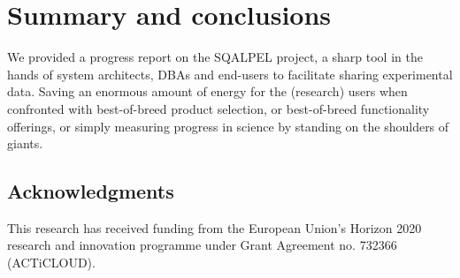 \documentclass{cidr-2019}
\begin{document}
\section{Summary and conclusions}\label{Summary and conclusions}

We provided a progress report on the {\sc SQALPEL} project, a sharp
tool in the hands of system architects, DBAs and end-users to
facilitate sharing experimental data.
Saving an enormous amount of energy for the (research) users when
confronted with best-of-breed product selection, or best-of-breed
functionality offerings, or simply measuring progress in science by
standing on the shoulders of giants.







\subsection*{Acknowledgments} This research has received funding from the European Union's Horizon 2020 research and innovation programme under Grant Agreement no. 732366 (ACTiCLOUD).

{\small   }
\end{document}
